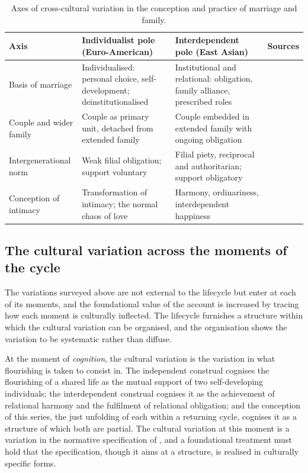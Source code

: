 \begin{table}[t]
\centering
\small
\renewcommand{\arraystretch}{1.25}
\caption{Axes of cross-cultural variation in the conception and practice of marriage and family.}
\label{p11:tab:family}
\begin{tabularx}{\linewidth}{@{}>{\raggedright\arraybackslash}p{2.7cm} >{\raggedright\arraybackslash}X >{\raggedright\arraybackslash}X >{\raggedright\arraybackslash}p{2.4cm}@{}}
\toprule
\rowcolor{pageblush}
\textbf{\textcolor{rosedeep}{Axis}} & \textbf{\textcolor{rosedeep}{Individualist pole (Euro-American)}} & \textbf{\textcolor{rosedeep}{Interdependent pole (East Asian)}} & \textbf{\textcolor{rosedeep}{Sources}} \\
\midrule
Basis of marriage & Individualised: personal choice, self-development; deinstitutionalised & Institutional and relational: obligation, family alliance, prescribed roles & \textcite{cherlin2004,cherlin2020} \\
Couple and wider family & Couple as primary unit, detached from extended family & Couple embedded in extended family with ongoing obligation & \textcite{ji2015,bengtson1991} \\
Intergenerational norm & Weak filial obligation; support voluntary & Filial piety, reciprocal and authoritarian; support obligatory & \textcite{yeh2013,kagitcibasi2005} \\
Conception of intimacy & Transformation of intimacy; the normal chaos of love & Harmony, ordinariness, interdependent happiness & \textcite{giddens1992,beck1995,hitokoto2015} \\
\bottomrule
\end{tabularx}
\end{table}

\subsection{The cultural variation across the moments of the cycle}
\label{p11:sec:cc-lifecycle}

The variations surveyed above are not external to the lifecycle but enter at each of its moments, and the foundational value of the account is increased by tracing how each moment is culturally inflected. The lifecycle furnishes a structure within which the cultural variation can be organised, and the organisation shows the variation to be systematic rather than diffuse.

At the moment of \emph{cognition}, the cultural variation is the variation in what flourishing is taken to consist in. The independent construal cognises the flourishing of a shared life as the mutual support of two self-developing individuals; the interdependent construal cognises it as the achievement of relational harmony and the fulfilment of relational obligation; and the conception of this series, the just unfolding of each within a returning cycle, cognises it as a structure of which both are partial. The cultural variation at this moment is a variation in the normative specification of , and a foundational treatment must hold that the specification, though it aims at a structure, is realised in culturally specific forms.

